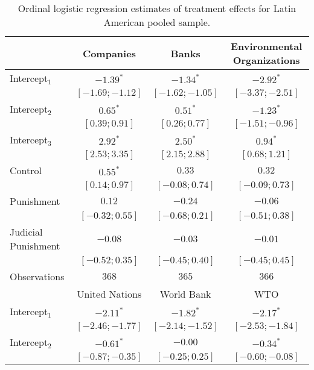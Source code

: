 \begin{table}[h]
\begin{center}
\caption{Ordinal logistic regression estimates of treatment effects for Latin American pooled sample.}
\begin{threeparttable}
\begin{tabular}{l c c c}
\hline
 & Companies & Banks & Environmental
Organizations \\
\hline
Intercept$_1$       & $-1.39^{*}$       & $-1.34^{*}$       & $-2.92^{*}$       \\
                    & $ [-1.69; -1.12]$ & $ [-1.62; -1.05]$ & $ [-3.37; -2.51]$ \\
Intercept$_2$       & $0.65^{*}$        & $0.51^{*}$        & $-1.23^{*}$       \\
                    & $ [ 0.39;  0.91]$ & $ [ 0.26;  0.77]$ & $ [-1.51; -0.96]$ \\
Intercept$_3$       & $2.92^{*}$        & $2.50^{*}$        & $0.94^{*}$        \\
                    & $ [ 2.53;  3.35]$ & $ [ 2.15;  2.88]$ & $ [ 0.68;  1.21]$ \\
Control             & $0.55^{*}$        & $0.33$            & $0.32$            \\
                    & $ [ 0.14;  0.97]$ & $ [-0.08;  0.74]$ & $ [-0.09;  0.73]$ \\
Punishment          & $0.12$            & $-0.24$           & $-0.06$           \\
                    & $ [-0.32;  0.55]$ & $ [-0.68;  0.21]$ & $ [-0.51;  0.38]$ \\
Judicial Punishment & $-0.08$           & $-0.03$           & $-0.01$           \\
                    & $ [-0.52;  0.35]$ & $ [-0.45;  0.40]$ & $ [-0.45;  0.45]$ \\
\hline
Observations        & $368$             & $365$             & $366$             \\
\hline
 & United Nations & World Bank & WTO \\
\hline
Intercept$_1$       & $-2.11^{*}$       & $-1.82^{*}$       & $-2.17^{*}$       \\
                    & $ [-2.46; -1.77]$ & $ [-2.14; -1.52]$ & $ [-2.53; -1.84]$ \\
Intercept$_2$       & $-0.61^{*}$       & $-0.00$           & $-0.34^{*}$       \\
                    & $ [-0.87; -0.35]$ & $ [-0.25;  0.25]$ & $ [-0.60; -0.08]$ \\

\end{tabular}
\end{threeparttable}
\end{center}
\end{table}
